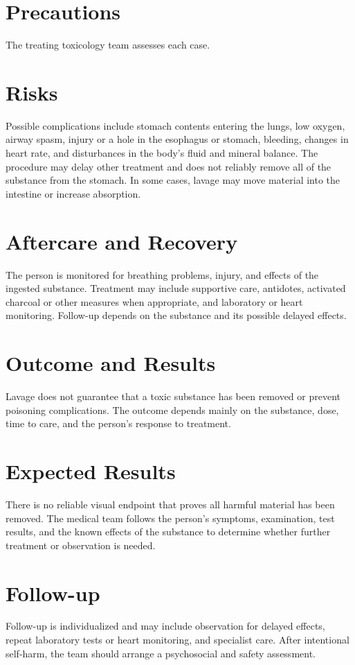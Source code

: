 \section*{Precautions}
The treating toxicology team assesses each case.

\section*{Risks}
Possible complications include stomach contents entering the lungs, low oxygen, airway spasm, injury or a hole in the esophagus or stomach, bleeding, changes in heart rate, and disturbances in the body's fluid and mineral balance. The procedure may delay other treatment and does not reliably remove all of the substance from the stomach. In some cases, lavage may move material into the intestine or increase absorption.

\section*{Aftercare and Recovery}
The person is monitored for breathing problems, injury, and effects of the ingested substance. Treatment may include supportive care, antidotes, activated charcoal or other measures when appropriate, and laboratory or heart monitoring. Follow-up depends on the substance and its possible delayed effects.

\section*{Outcome and Results}
Lavage does not guarantee that a toxic substance has been removed or prevent poisoning complications. The outcome depends mainly on the substance, dose, time to care, and the person's response to treatment.

\section*{Expected Results}
There is no reliable visual endpoint that proves all harmful material has been removed. The medical team follows the person's symptoms, examination, test results, and the known effects of the substance to determine whether further treatment or observation is needed.

\section*{Follow-up}
Follow-up is individualized and may include observation for delayed effects, repeat laboratory tests or heart monitoring, and specialist care. After intentional self-harm, the team should arrange a psychosocial and safety assessment.

